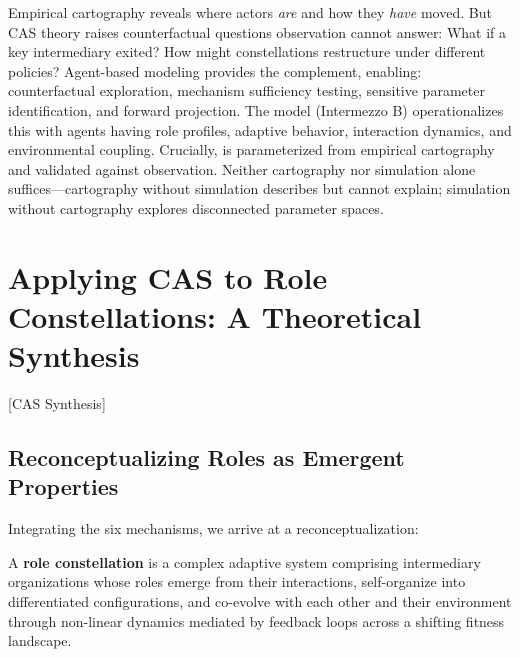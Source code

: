 \documentclass[../main.tex]{subfiles}
\begin{document}
Empirical cartography reveals where actors \emph{are} and how they \emph{have} moved. But CAS theory raises counterfactual questions observation cannot answer: What if a key intermediary exited? How might constellations restructure under different policies? Agent-based modeling provides the complement, enabling: counterfactual exploration, mechanism sufficiency testing, sensitive parameter identification, and forward projection. The \RoleSim model (Intermezzo B) operationalizes this with agents having role profiles, adaptive behavior, interaction dynamics, and environmental coupling. Crucially, \RoleSim is parameterized from empirical cartography and validated against observation. Neither cartography nor simulation alone suffices---cartography without simulation describes but cannot explain; simulation without cartography explores disconnected parameter spaces.


\section{Applying CAS to Role Constellations: A Theoretical Synthesis}[CAS Synthesis]

\subsection{Reconceptualizing Roles as Emergent Properties}

Integrating the six mechanisms, we arrive at a reconceptualization:

\begin{roledef}
A \textbf{role constellation} is a complex adaptive system comprising intermediary organizations whose roles emerge from their interactions, self-organize into differentiated configurations, and co-evolve with each other and their environment through non-linear dynamics mediated by feedback loops across a shifting fitness landscape.
\end{roledef}
\end{document}
